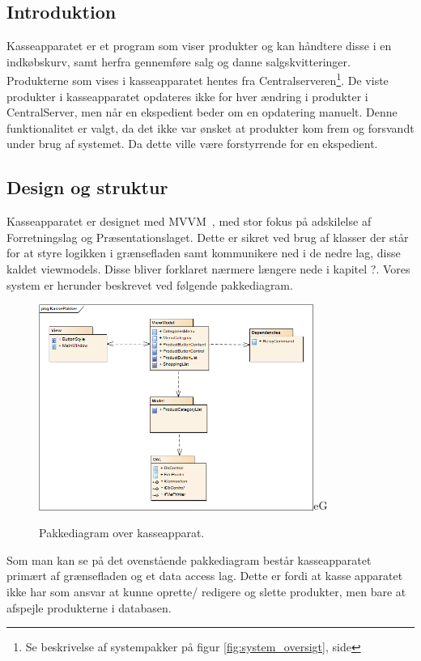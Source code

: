 \subsection{Introduktion}
Kasseapparatet er et program som viser produkter og kan håndtere disse i en indkøbskurv, samt herfra gennemføre salg og danne salgskvitteringer. Produkterne som vises i kasseapparatet hentes fra Centralserveren\footnote{Se beskrivelse af systempakker på figur \ref{fig:system_oversigt}, side \pageref{fig:system_oversigt}}. De viste produkter i kasseapparatet opdateres ikke for hver ændring i produkter i CentralServer, men når en ekspedient beder om en opdatering manuelt. Denne funktionalitet er valgt, da det ikke var ønsket at produkter kom frem og forsvandt under brug af systemet. Da dette ville være forstyrrende for en ekspedient.


\subsection{Design og struktur}
Kasseapparatet er designet med MVVM~\cite{MVVM}, med stor fokus på adskilelse af Forretningslag og Præsentationslaget. Dette er sikret ved brug af klasser der står for at styre logikken i grænsefladen samt kommunikere ned i de nedre lag, disse kaldet viewmodels. Disse bliver forklaret nærmere længere nede i kapitel ?.
Vores system er herunder beskrevet ved følgende pakkediagram.	

\begin{figure}[H]
	\centering
	\includegraphics[width=0.8\textwidth]{Systemdesign/Frontend/pics/KassePakker}eG
	\caption{Pakkediagram over kasseapparat.}
	\label{fig:EndeligUI}
\end{figure}

Som man kan se på det ovenstående pakkediagram består kasseapparatet primært af grænsefladen og et data access lag. Dette er fordi at kasse apparatet ikke har som ansvar at kunne oprette/ redigere og slette produkter, men bare at afspejle produkterne i databasen. 

